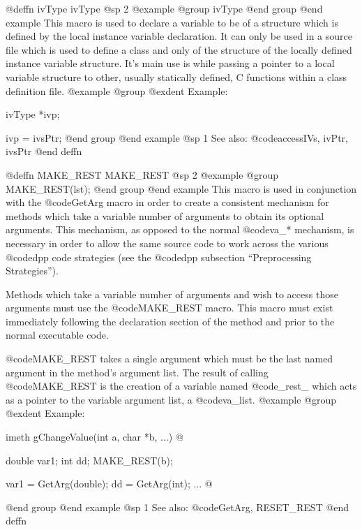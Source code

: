 {{{{@deffn {ivType} ivType
@sp 2
@example
@group
ivType
@end group
@end example
This macro is used to declare a variable to be of a structure which is defined
by the local instance variable declaration.  It can only be used in a source
file which is used to define a class and only of the structure of the locally
defined instance variable structure.  It's main use is while passing a pointer
to a local variable structure to other, usually statically defined, C functions
within a class definition file.
@example
@group
@exdent Example:

ivType  *ivp;

ivp = ivsPtr;
@end group
@end example
@sp 1
See also:  @code{accessIVs, ivPtr, ivsPtr}
@end deffn


















@deffn {MAKE_REST} MAKE_REST
@sp 2
@example
@group
MAKE_REST(lst);
@end group
@end example
This macro is used in conjunction with the @code{GetArg} macro in order
to create a consistent mechanism for methods which take a variable
number of arguments to obtain its optional arguments.  This mechanism,
as opposed to the normal @code{va_*} mechanism, is necessary in order to
allow the same source code to work across the various @code{dpp} code
strategies (see the @code{dpp} subsection ``Preprocessing Strategies'').

Methods which take a variable number of arguments and wish to access
those arguments must use the @code{MAKE_REST} macro.  This macro must
exist immediately following the declaration section of the method and
prior to the normal executable code.

@code{MAKE_REST} takes a single argument which must be the last named
argument in the method's argument list.  The result of calling
@code{MAKE_REST} is the creation of a variable named @code{_rest_}
which acts as a pointer to the variable argument list, a
@code{va_list}.
@example
@group
@exdent Example:

imeth  gChangeValue(int a, char *b, ...)
@{
        double  var1;
        int     dd;
        MAKE_REST(b);

        var1 = GetArg(double);
        dd = GetArg(int);
        ...
@}
@end group
@end example
@sp 1
See also:  @code{GetArg, RESET_REST}
@end deffn
















}}}}
